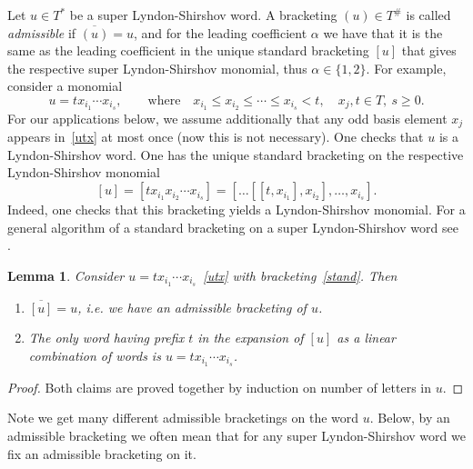 \documentclass[12pt, reqno]{amsart}
\newtheorem{lemma}[theorem]{Lemma}
\theoremstyle{remark}
\theoremstyle{definition}
\numberwithin{equation}{section}
\begin{document}
Let $u\in T^*$ be a super Lyndon-Shirshov word. A bracketing $(u)\in T^\#$ is called {\it admissible} if
$\overline{(u)}=u$, and  for the leading coefficient $\alpha$ we have that it is the same as the leading coefficient in the unique standard bracketing $[u]$ that gives the respective super Lyndon-Shirshov monomial, thus  $\alpha\in \{1,2\}$.
For example, consider a monomial 
\begin{equation}\label{utx}
u=t x_{i_1}\cdots x_{i_s},\qquad\text{where}\quad x_{i_1}\le x_{i_2}\le \cdots \le x_{i_s}<t, \quad x_j,t\in T, \ s\ge 0.
\end{equation} 
For our applications below, we assume additionally that any odd basis element $x_j$ appears in~\eqref{utx} at most once  (now this is not necessary).
One checks that $u$ is a Lyndon-Shirshov word. One has the unique standard bracketing on the respective Lyndon-Shirshov monomial
\begin{equation}\label{stand}
[u]=[t x_{i_1}x_{i_2}\cdots x_{i_s}]= [\ldots [[t,x_{i_1}],x_{i_2}],\ldots, x_{i_s}]. 
\end{equation}
Indeed, one checks that this bracketing yields a Lyndon-Shirshov monomial. For a general algorithm of a standard bracketing on a super Lyndon-Shirshov word see \cite{BMPZ}. 



\begin{lemma} \label{Ladmiss}
Consider $u=t x_{i_1}\cdots x_{i_s}$~\eqref{utx} with bracketing~\eqref{stand}. Then 
\begin{enumerate} 
\item $\overline{[u]}=u$, i.e. we have an admissible bracketing of $u$.
\item The only word  having prefix $t$  in the expansion of $[u]$  as a linear combination of words is $u=t x_{i_1}\cdots x_{i_s}$.  
\end{enumerate}
\end{lemma}
\begin{proof}
Both claims are proved together by induction on number of letters in $u$.
\end{proof}
Note we get many different admissible bracketings on the word $u$.
Below, by an admissible bracketing we often mean that for any super Lyndon-Shirshov word we fix an admissible bracketing on it.
\end{document}
